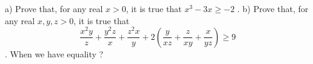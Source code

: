 a) Prove that, for any real $x>0$, it is true that $x^3-3x\ge -2$ .
b) Prove that, for any real $x,y,z>0$, it is true that
$$\frac{x^2y}{z}+\frac{y^2z}{x}+\frac{z^2x}{y}+2\left(\frac{y}{xz}+\frac{z}{xy}+\frac{x}{yz} \right)\ge 9$$. When we have equality ?